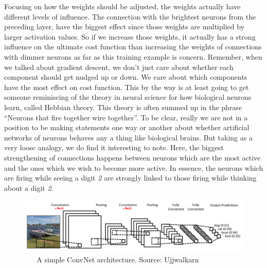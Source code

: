 \documentclass[master]{thesis-uestc}
\begin{document}
Focusing on how the weights should be adjusted, the weights actually have different levels of influence. The connection with the brightest neurons from the preceding layer, have the biggest effect since those weights are multiplied by larger activation values. So if we increase those weights, it actually has a strong influence on the ultimate cost function than increasing the weights of connections with dimmer neurons as far as this training example is concern. Remember, when we talked about gradient descent, we don't just care about whether each component should get nudged up or down. We care about which components have the most effect on cost function. This by the way is at least going to get someone reminiscing of the theory in neural science for how biological neurons learn, called Hebbian theory\cite{Donald1949}. This theory is often summed up in the phrase ``Neurons that fire together wire together''. To be clear, really we are not in a position to be making statements one way or another about whether artificial networks of neurons behaves any a thing like biological brains. But taking as a very loose analogy, we do find it interesting to note. Here, the biggest strengthening of connections happens between neurons which are the most active and the ones which we wish to become more active. In essence, the neurons which are firing while seeing a digit \textit{2} are strongly linked to those firing while thinking about a digit \textit{2}.



\begin{figure}[ht]
\includegraphics[width=5in]{pic/ConvNet_Arch.png}
\caption{\,\,\,\,\,\,\,\,\,\,A simple ConvNet architecture. Source: Ujjwalkarn\cite{intuitiveCNN}}
\label{ConvNet_arch}
\end{figure}
\end{document}
